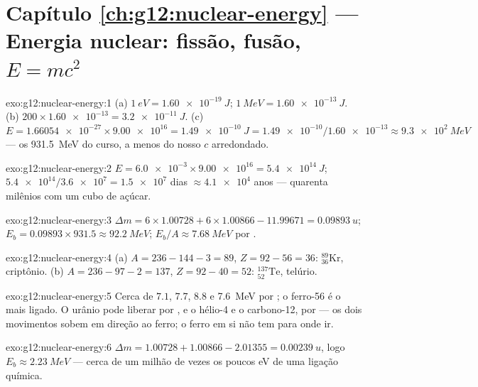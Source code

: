 \section*{Capítulo \ref{ch:g12:nuclear-energy} --- Energia nuclear: fissão, fusão, $E=mc^2$}

\begin{solution}{exo:g12:nuclear-energy:1}
(a) $\qty{1}{eV} = \qty{1.60e-19}{J}$; $\qty{1}{MeV} = \qty{1.60e-13}{J}$.
(b) $200 \times \num{1.60e-13} = \qty{3.2e-11}{J}$.
(c) $E = \num{1.66054e-27} \times \num{9.00e16} = \qty{1.49e-10}{J}
= \num{1.49e-10}/\num{1.60e-13} \approx \qty{9.3e2}{MeV}$ --- os
\qty{931.5}{MeV} do curso, a menos do nosso $c$ arredondado.
\end{solution}

\begin{solution}{exo:g12:nuclear-energy:2}
$E = \num{6.0e-3} \times \num{9.00e16} = \qty{5.4e14}{J}$;
$\num{5.4e14}/\num{3.6e7} = \num{1.5e7}$ dias $\approx \num{4.1e4}$ anos
--- quarenta milênios com um cubo de açúcar.
\end{solution}

\begin{solution}{exo:g12:nuclear-energy:3}
$\Delta m = 6 \times 1.00728 + 6 \times 1.00866 - 11.99671 =
\qty{0.09893}{u}$; $E_b = 0.09893 \times 931.5 \approx \qty{92.2}{MeV}$;
$E_b/A \approx \qty{7.68}{MeV}$ por .
\end{solution}

\begin{solution}{exo:g12:nuclear-energy:4}
(a) $A = 236 - 144 - 3 = 89$, $Z = 92 - 56 = 36$:
${}^{89}_{36}\mathrm{Kr}$, criptônio.
(b) $A = 236 - 97 - 2 = 137$, $Z = 92 - 40 = 52$:
${}^{137}_{52}\mathrm{Te}$, telúrio.
\end{solution}

\begin{solution}{exo:g12:nuclear-energy:5}
Cerca de $7.1$, $7.7$, $8.8$ e \qty{7.6}{MeV} por ; o ferro-56 é o
mais ligado. O urânio pode liberar  por , e o hélio-4 e o
carbono-12, por  --- os dois movimentos sobem em direção ao ferro; o
ferro em si não tem para onde ir.
\end{solution}

\begin{solution}{exo:g12:nuclear-energy:6}
$\Delta m = 1.00728 + 1.00866 - 2.01355 = \qty{0.00239}{u}$, logo
$E_b \approx \qty{2.23}{MeV}$ --- cerca de um milhão de vezes os poucos
\unit{eV} de uma ligação química.
\end{solution}

